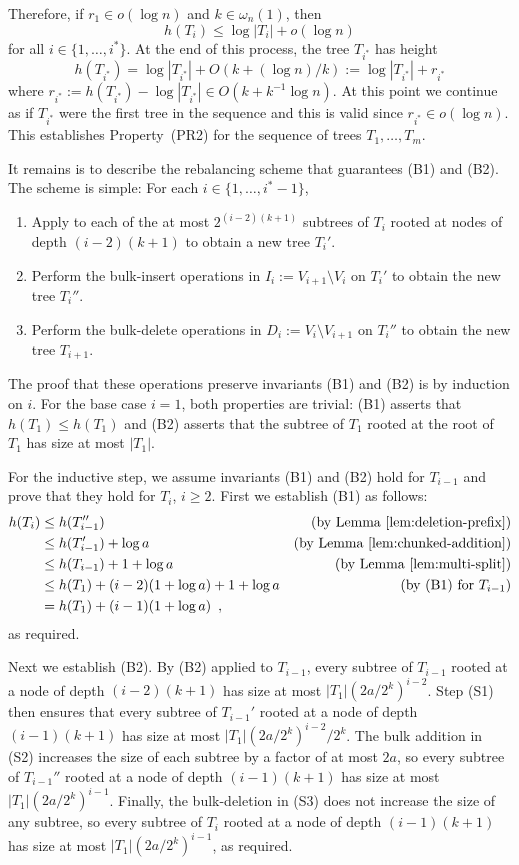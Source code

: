 \documentclass[kpfonts]{patmorin}
\begin{document}
Therefore, if $r_1\in o(\log n)$ and $k\in\omega_{n}(1)$, then
\[  h(T_i) \le \log |T_i| + o(\log n) \]
for all $i\in\{1,\ldots,i^*\}$.  At the end of this process, the tree $T_{i^*}$ has height
\[
    h(T_{i^*})= \log |T_{i^*}| + O(k + (\log n)/k) := \log |T_{i^*}| + r_{i^*}
\]
where $r_{i^*}:=h(T_{i^*})-\log|T_{i^*}|\in O(k + k^{-1}\log n)$.  At this point we continue as if $T_{i^*}$ were the first tree in the sequence and this is valid since $r_{i^*}\in o(\log n)$.  This establishes Property~(PR2) for the sequence of trees $T_1,\ldots,T_m$.  

It remains is to describe the rebalancing scheme that guarantees (B1) and (B2).  The scheme is simple: For each $i\in\{1,\ldots,i^*-1\}$,
\begin{enumerate}[(S1)]
  \item Apply  to each of the at most $2^{(i-2)(k+1)}$ subtrees of $T_i$ rooted at nodes of depth $(i-2)(k+1)$ to obtain a new tree $T_i'$.
  \item Perform the bulk-insert operations in $I_i:=V_{i+1}\setminus V_i$ on $T_i'$ to obtain the new tree $T_i''$.
  \item Perform the bulk-delete operations in $D_i:=V_{i}\setminus V_{i+1}$ on $T_i''$ to obtain the new tree $T_{i+1}$.
\end{enumerate}

The proof that these operations preserve invariants (B1) and (B2) is by induction on $i$.  For the base case $i=1$, both properties are trivial: (B1) asserts that $h(T_1)\le h(T_1)$ and (B2) asserts that the subtree of $T_1$ rooted at the root of $T_1$ has size at most $|T_1|$.

For the inductive step, we assume invariants (B1) and (B2) hold for $T_{i-1}$ and prove that they hold for $T_{i}$, $i\ge 2$.  First we establish (B1) as follows:
\begin{align*}  
  h(T_{i}) & \le h(T_{i-1}'') & \text{(by \lemref{deletion-prefix})} \\
          & \le h(T_{i-1}') + \log a & \text{(by \lemref{chunked-addition})} \\
          & \le h(T_{i-1}) + 1 + \log a & \text{(by \lemref{multi-split})} \\
          & \le h(T_1) + (i-2)(1+\log a) + 1 + \log a & \text{(by (B1) for $T_{i-1}$)}\\
          & = h(T_1) + (i-1)(1+\log a) \enspace ,
\end{align*}
as required.

Next we establish (B2).  By (B2) applied to $T_{i-1}$, every subtree of $T_{i-1}$ rooted at a node of depth $(i-2)(k+1)$ has size at most $|T_{1}|(2a/2^k)^{i-2}$.  Step (S1) then ensures that every subtree of $T_{i-1}'$ rooted at a node of depth $(i-1)(k+1)$ has size at most $|T_{1}|(2a/2^k)^{i-2}/2^k$.  The bulk addition in (S2) increases the size of each subtree by a factor of at most $2a$, so every subtree of $T_{i-1}''$ rooted at a node of depth $(i-1)(k+1)$ has size at most $|T_{1}|(2a/2^k)^{i-1} $.
Finally, the bulk-deletion in (S3) does not increase the size of any subtree, so every subtree of $T_{i}$ rooted at a node of depth $(i-1)(k+1)$ has size at most $|T_{1}|(2a/2^k)^{i-1}$, as required.
\end{document}
